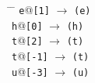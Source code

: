 \begin{exe}
\ex \label{ex:positional-morphs}
\begin{xlist}
\begin{tabbing}
\hspace{0.7in} \= \hspace{0.5in} \=  \hspace{4.5in} \kill
 \texttt{e}\textrm{@}\texttt{[1]} \> $\to$ \>   \texttt{(e)} \\
 \texttt{h}\textrm{@}\texttt{[0]}  \>$\to$ \>     \texttt{(h)} \\
 \texttt{t}\textrm{@}\texttt{[2]}  \> $\to$   \>       \texttt{(t)} \\
 \texttt{t}@\texttt{[-1]}  \>  $\to$   \>    \texttt{(t)} \\
 \texttt{u}\textrm{@}\texttt{[-3]} \>   $\to$   \>   \texttt{(u)} \\
\end{tabbing}
\end{xlist}
\end{exe}



